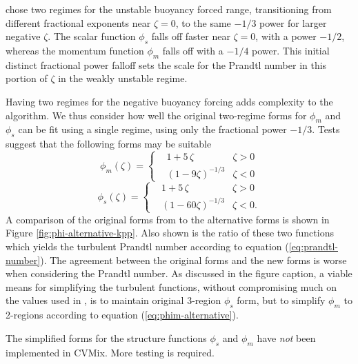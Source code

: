 \cite{LargeKPP} chose two regimes for the unstable buoyancy forced
range, transitioning from different fractional exponents near $\zeta =
0$, to the same $-1/3$ power for larger negative $\zeta$.  The scalar
function $\phi_{s}$ falls off faster near $\zeta=0$, with a power
$-1/2$, whereas the momentum function $\phi_{m}$ falls off with a
$-1/4$ power.  This initial distinct fractional power falloff sets the
scale for the Prandtl number in this portion of $\zeta$ in the weakly
unstable regime.

Having two regimes for the negative buoyancy forcing adds complexity
to the algorithm.  We thus consider how well the original two-regime
forms for $\phi_{m}$ and $\phi_{s}$ can be fit using a single regime,
using only the fractional power $-1/3$.  Tests suggest that the
following forms may be suitable
\begin{equation}
   \phi_{m}(\zeta) = \left\{
 \begin{array}{lll}
  &1 + 5 \, \zeta      &\zeta > 0 \\
  &(1-9\zeta)^{-1/3}  &\zeta < 0 
 \end{array}
 \right.
\label{eq:phim-alternative}
\end{equation}
\begin{equation}
   \phi_{s}(\zeta) = \left\{
 \begin{array}{lll}
  &1 + 5 \, \zeta      &\zeta > 0 \\
  &(1-60\zeta)^{-1/3}  &\zeta < 0. 
 \end{array}
 \right.
\label{eq:phis-alternative}
\end{equation}
A comparison of the original forms from \cite{LargeKPP} to the
alternative forms is shown in Figure
\ref{fig:phi-alternative-kpp}. Also shown is the ratio of these two
functions which yields the turbulent Prandtl number according to
equation (\ref{eq:prandtl-number}).  The agreement between the
original forms and the new forms is worse when considering the Prandtl
number.  As discussed in the figure caption, a viable means for
simplifying the turbulent functions, without compromising much on the
values used in \cite{LargeKPP}, is to maintain original 3-region
$\phi_{s}$ form, but to simplify $\phi_{m}$ to 2-regions according to
equation (\ref{eq:phim-alternative}).

The simplified forms for the structure functions $\phi_{s}$ and
$\phi_{m}$ have {\it not} been implemented in CVMix.  More testing is
required.


